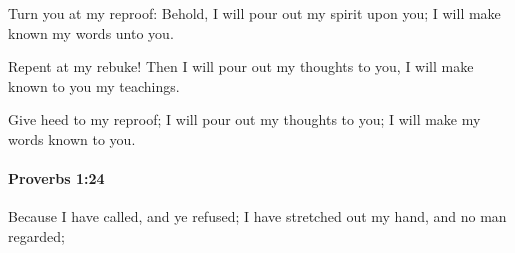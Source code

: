 			\begin{versebox}
					\item[BHS] 
					\item[ASV] Turn you at my reproof: Behold, I will pour out my spirit upon you; I will make known my words unto you.
					\item[NIV] Repent at my rebuke! Then I will pour out my thoughts to you, I will make known to you my teachings.
					\item[NRSV] Give heed to my reproof; I will pour out my thoughts to you; I will make my words known to you.
			\end{versebox}

		\paragraph{Proverbs 1:24} %
			\label{PROVERBS-1-24}

			Because I have called, and ye refused; I have stretched out my hand, and no man regarded;

